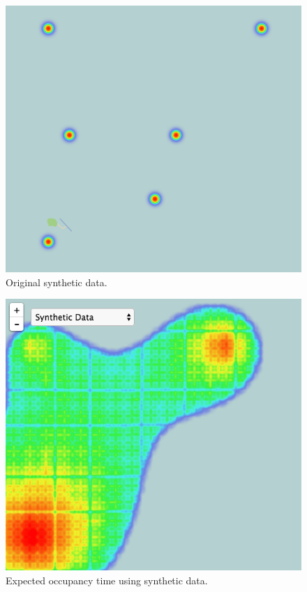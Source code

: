 \documentclass[12pt]{article}
\begin{document}
\begin{figure}[H]
    \centering
    \includegraphics[width=\textwidth]{plots/synthetic_base.png}
    \caption{Original synthetic data.}
    \label{fig:synth_origin}
\end{figure}

\begin{figure}[H]
    \centering
    \includegraphics[width=\textwidth]{plots/synthetic_sample.png}
    \caption{Expected occupancy time using synthetic data.}
    \label{fig:synthetic}
\end{figure}
\end{document}
